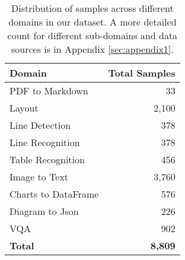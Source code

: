 \begin{table}[t]
\centering
\small
\begin{tabular}{@{}p{4cm}r@{}}
\toprule
\textbf{Domain} & \textbf{Total Samples} \\
\midrule
PDF to Markdown & 33 \\
Layout & 2,100 \\
Line Detection & 378 \\
Line Recognition & 378 \\
Table Recognition & 456 \\
Image to Text & 3,760 \\
Charts to DataFrame & 576 \\
Diagram to Json & 226 \\
VQA & 902 \\
\midrule
\textbf{Total} & \textbf{8,809} \\
\bottomrule
\end{tabular}
\caption{Distribution of samples across different domains in our dataset. A more detailed count for different sub-domains and data sources is in Appendix \ref{sec:appendix1}.}
\label{tab:dataset-distribution}
\end{table}